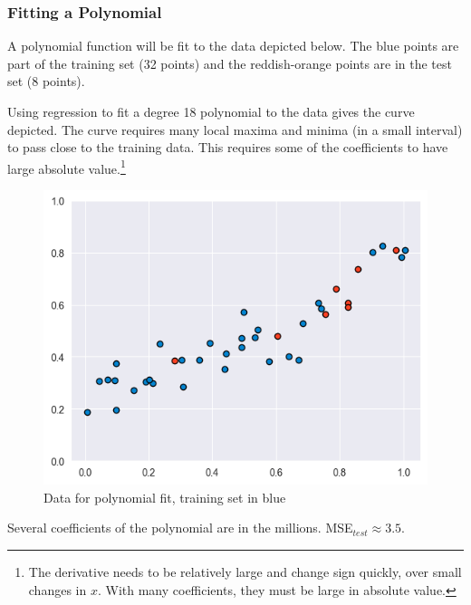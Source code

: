 \documentclass[smaller]{beamer}
\theoremstyle{example}
\begin{document}
\begin{frame}
    \frametitle{Fitting a Polynomial}
    \renewcommand\thefootnote{\textcolor{white}{\arabic{footnote}}}
    A polynomial function will be fit to the data depicted below. The blue points are part of the training set (32 points) and the reddish-orange points are in the test set (8 points).
    
    {\color{white}Using regression to fit a degree 18 polynomial to the data gives the curve depicted. The curve requires many local maxima and minima (in a small interval) to pass close to the training data. This requires some of the coefficients to have large absolute value.}\footnote{{\color{white}The derivative needs to be relatively large and change sign quickly, over small changes in $x$. With many coefficients, they must be large in absolute value.}}
    
    \begin{figure}
        \begin{center}
            \includegraphics[height=0.30\textheight]{../../Images/data_polynomial_fit.png}
        \end{center}
        \caption{Data for polynomial fit, training set in blue}
    \end{figure}

    {\color{white}Several coefficients of the polynomial are in the millions. MSE$_{test}\approx 3.5$.}
\end{frame}
\end{document}
